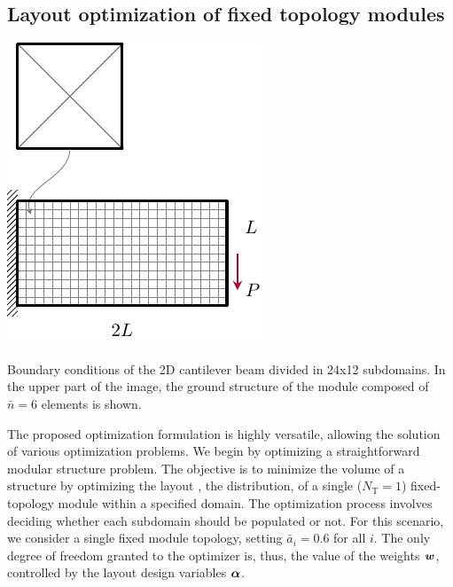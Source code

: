 \subsection{Layout optimization of fixed topology modules}
\begin{marginfigure}
    \centering
    \includegraphics[width=\linewidth]{figures/06_DMO/00_cantilever_bcs/cant_mesh.pdf}
    \caption{Boundary conditions of the 2D cantilever beam divided in 24x12 subdomains. In the upper part of the image, the ground structure of the module composed of $\bar{n}=6$ elements is shown.}
    \label{fig:06_cant_BC_GS}
\end{marginfigure}
The proposed optimization formulation is highly versatile, allowing the solution of various optimization problems. We begin by optimizing a straightforward modular structure problem. The objective is to minimize the volume of a structure by optimizing the layout \ie, the distribution, of a single ($N_\text{T}=1$) fixed-topology module within a specified domain. The optimization process involves deciding whether each subdomain should be populated or not. For this scenario, we consider a single fixed module topology, setting $\bar{a}_i=0.6$ for all $i$. The only degree of freedom granted to the optimizer is, thus, the value of the weights $\bm{w}$, controlled by the layout design variables $\bm{\alpha}$.

